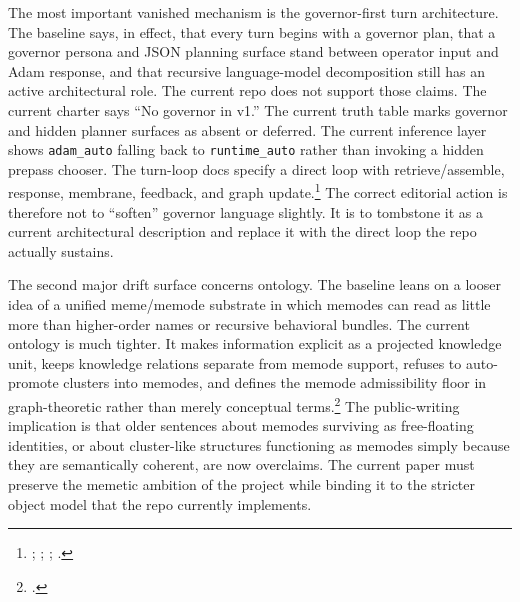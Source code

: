 \documentclass[10pt]{article}
\begin{document}
The most important vanished mechanism is the governor-first turn architecture. The baseline says, in effect, that every turn begins with a governor plan, that a governor persona and JSON planning surface stand between operator input and Adam response, and that recursive language-model decomposition still has an active architectural role. The current repo does not support those claims. The current charter says ``No governor in v1.'' The current truth table marks governor and hidden planner surfaces as absent or deferred. The current inference layer shows \texttt{adam\_auto} falling back to \texttt{runtime\_auto} rather than invoking a hidden prepass chooser. The turn-loop docs specify a direct loop with retrieve/assemble, response, membrane, feedback, and graph update.\footnote{; ; ; .} The correct editorial action is therefore not to ``soften'' governor language slightly. It is to tombstone it as a current architectural description and replace it with the direct loop the repo actually sustains.

The second major drift surface concerns ontology. The baseline leans on a looser idea of a unified meme/memode substrate in which memodes can read as little more than higher-order names or recursive behavioral bundles. The current ontology is much tighter. It makes information explicit as a projected knowledge unit, keeps knowledge relations separate from memode support, refuses to auto-promote clusters into memodes, and defines the memode admissibility floor in graph-theoretic rather than merely conceptual terms.\footnote{.} The public-writing implication is that older sentences about memodes surviving as free-floating identities, or about cluster-like structures functioning as memodes simply because they are semantically coherent, are now overclaims. The current paper must preserve the memetic ambition of the project while binding it to the stricter object model that the repo currently implements.
\end{document}

